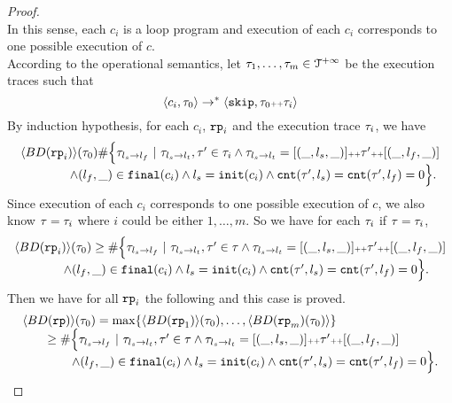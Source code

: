 \begin{proof}
\\
In this sense, each $c_i$ is a loop program and execution of each $c_i$ corresponds to one possible execution of $c$.
\\
According to the operational semantics, let $\mathtt{\tau}_1, \ldots, \mathtt{\tau}_m \in \mathcal{T}^{+\infty}$ be the execution traces such that 
\[
  \langle c_i, \mathtt{\tau}_0 \rangle \to^* 
  \langle \mathtt{skip}, \mathtt{\tau}_0 {\scriptscriptstyle ++} \mathtt{\tau}_i \rangle
\]
By induction hypothesis, for each $c_i$, $\mathtt{rp}_i$ and the execution trace $\mathtt{\tau}_i$, we have 
\[
  \begin{array}{l}
  \langle BD(\mathtt{rp}_i) \rangle(\mathtt{\tau}_0) 
  \# \Big\{\mathtt{\tau}_{l_s \to l_f} ~\vert~ \mathtt{\tau}_{l_s \to l_t}, \mathtt{\tau}' \in \mathtt{\tau}_i \land \mathtt{\tau}_{l_s \to l_t} = [(\_, l_s, \_)] {\scriptscriptstyle ++} \mathtt{\tau}' {\scriptscriptstyle ++} [(\_, l_f, \_)]
  \\ \qquad \qquad
  \land (l_{f}, \_) \in \mathtt{final}(c_i)
  \land l_s = \mathtt{init}(c_i)
  \land \mathtt{cnt}(\mathtt{\tau}', l_s) = \mathtt{cnt}(\mathtt{\tau}', l_f) = 0 
  \Big\}.
  \end{array}
\]
Since execution of each $c_i$ corresponds to one possible execution of $c$, we also know
$\mathtt{\tau} = \mathtt{\tau}_i$ where $i$ could be either $1, \ldots, m$.
So we have for each $\mathtt{\tau}_i$ if $\mathtt{\tau} = \mathtt{\tau}_i$, 
\[
  \begin{array}{l}
    \langle BD(\mathtt{rp}_i) \rangle(\mathtt{\tau}_0) \geq
    \# \Big\{\mathtt{\tau}_{l_s \to l_f} ~\vert~ \mathtt{\tau}_{l_s \to l_t}, \mathtt{\tau}' \in \mathtt{\tau} \land \mathtt{\tau}_{l_s \to l_t} = [(\_, l_s, \_)] {\scriptscriptstyle ++} \mathtt{\tau}' {\scriptscriptstyle ++} [(\_, l_f, \_)]
    \\ \qquad \qquad
    \land (l_{f}, \_) \in \mathtt{final}(c_i)
    \land l_s = \mathtt{init}(c_i)
    \land \mathtt{cnt}(\mathtt{\tau}', l_s) = \mathtt{cnt}(\mathtt{\tau}', l_f) = 0 
    \Big\}.
    \end{array}
\]
Then we have for all $\mathtt{rp}_i$ the following and this case is proved.
\[
  \begin{array}{l}
    \config{BD(\rprog)}(\trace_0) = 
    \max\left\{ \config{BD(\rprog_1)}(\trace_0), \ldots, \config{BD(\rprog_m)(\trace_0)} \right\}
    \\ \qquad 
    \geq
    \# \Big\{\trace_{l_s \to l_f} ~\vert~ \trace_{l_s \to l_t}, \trace' \in \trace \land \trace_{l_s \to l_t} = [(\_, l_s, \_)] \tracecat \trace' \tracecat [(\_, l_f, \_)]
    \\ \qquad \qquad
    \land (l_{f}, \_) \in \absfinal(c_i)
    \land l_s = \absinit(c_i)
    \land \counter(\trace', l_s) = \counter(\trace', l_f) = 0 
    \Big\}.
    \end{array}
\]


\end{proof}

